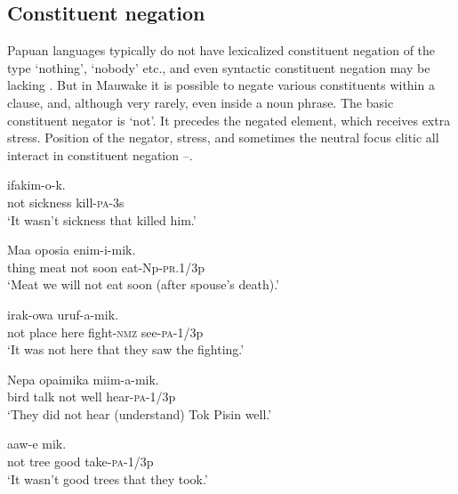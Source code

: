 \subsection{Constituent negation} \label{sec:6.2.2}

Papuan languages typically do not have lexicalized constituent negation of the type `nothing', `nobody' etc., and even syntactic constituent negation may be lacking \citep[271--272]{Reesink1987}. But in Mauwake it is possible to negate various constituents within a clause, and, although very rarely, even inside a noun phrase. The basic constituent negator is  `not'. It precedes the negated element, which receives extra stress. Position of the negator, stress, and sometimes the neutral focus clitic all interact in constituent negation --.

\ea%
\label{ex:6:x1102}
\gll {}    ifakim-o-k. \\
not  sickness  kill-\textsc{pa}-3s\\
\glt `It wasn't sickness that killed him.'
\z

\ea%
\label{ex:6:x1103}
\gll Maa  oposia      enim-i-mik. \\
thing  meat  not  soon  eat-Np-\textsc{pr}.1/3p\\
\glt `Meat we will not eat soon (after spouse's death).'
\z

\ea%
\label{ex:6:x1108}
\gll {}      irak-owa  uruf-a-mik. \\
not  place  here  fight-\textsc{nmz}  see-\textsc{pa}-1/3p\\
\glt `It was not here that they saw the fighting.'
\z

\ea%
\label{ex:6:x1104}
\gll Nepa  opaimika      miim-a-mik. \\
bird  talk  not  well  hear-\textsc{pa}-1/3p\\
\glt `They did not hear (understand) Tok Pisin well.'
\z

\ea%
\label{ex:6:x1105}
\gll {}     aaw-e\textstyleEmphasizedVernacularWords{-} mik. \\
not  tree  good  take-\textsc{pa}-1/3p\\
\glt `It wasn't good trees that they took.'
\z

